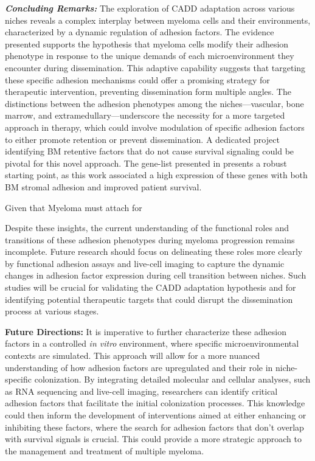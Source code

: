 \textbf{\textit{Concluding Remarks:}} The exploration of \ac{CADD} adaptation
across various niches reveals a complex interplay between myeloma cells and
their environments, characterized by a dynamic regulation of adhesion factors.
The evidence presented supports the hypothesis that myeloma cells modify their
adhesion phenotype in response to the unique demands of each microenvironment
they encounter during dissemination. This adaptive capability suggests that
targeting these specific adhesion mechanisms could offer a promising strategy
for therapeutic intervention, preventing dissemination form multiple angles. The
distinctions between the adhesion phenotypes among the niches—vascular, bone
marrow, and extramedullary—underscore the necessity for a more targeted approach
in therapy, which could involve modulation of specific adhesion factors to
either promote retention or prevent dissemination. A dedicated project
identifying BM retentive factors that do not cause survival signaling could be
pivotal for this novel approach. The gene-list presented in
 presents a robust starting point, as this work
associated a high expression of these genes with both BM stromal adhesion and
improved patient survival.

Given that Myeloma must attach for

Despite these insights, the current understanding of the functional roles and
transitions of these adhesion phenotypes during myeloma progression remains
incomplete. Future research should focus on delineating these roles more clearly
by functional adhesion assays and live-cell imaging to capture the dynamic
changes in adhesion factor expression during cell transition between niches.
Such studies will be crucial for validating the \ac{CADD} adaptation hypothesis
and for identifying potential therapeutic targets that could disrupt the
dissemination process at various stages.

\textbf{Future Directions:} It is imperative to further characterize these
adhesion factors in a controlled \textit{in vitro} environment, where specific
microenvironmental contexts are simulated. This approach will allow for a more
nuanced understanding of how adhesion factors are upregulated and their role in
niche-specific colonization. By integrating detailed molecular and cellular
analyses, such as RNA sequencing and live-cell imaging, researchers can identify
critical adhesion factors that facilitate the initial colonization processes.
This knowledge could then inform the development of interventions aimed at
either enhancing or inhibiting these factors, where the search for adhesion
factors that don't overlap with survival signals is crucial. This could provide
a more strategic approach to the management and treatment of multiple myeloma.






